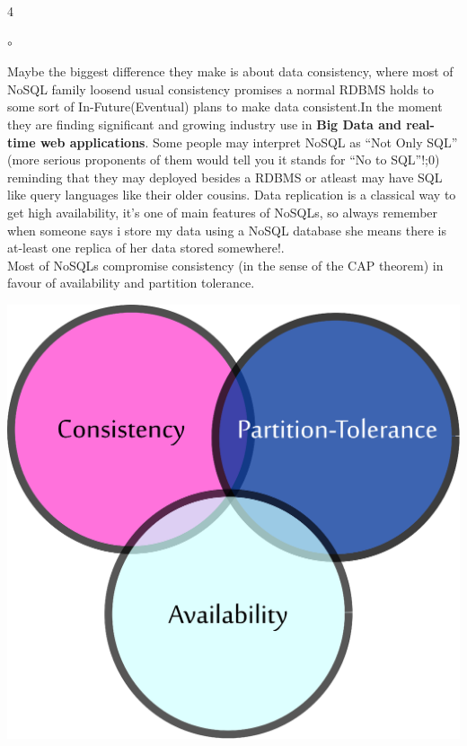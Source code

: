 \documentclass[a0,landscape]{a0poster}
\begin{document}
\begin{multicols}{4}
{\begin{list}{$\circ$}{}
\renewcommand{\labelitemi}{$\bullet$}

\item {}\par
\item {}\par
\item {}\par
 \end{list}
 
 \color{DarkSlateGray} 
Maybe the biggest difference they make is about data consistency, where most of NoSQL family loosend usual consistency promises a normal RDBMS holds to some sort of In-Future(Eventual) plans to make data consistent.In the moment they are finding significant and growing industry use in  \textbf{Big Data and real-time web applications}. Some people may interpret NoSQL as ``Not Only SQL'' (more serious proponents of them would tell you it stands for ``No to SQL''!;0) reminding that they may deployed besides a RDBMS or atleast may have SQL like query languages like their older cousins.
Data replication is a classical way to get high availability, it's one of main features of NoSQLs, so always remember when someone says i store my data using a NoSQL database she means there is at-least one replica of her data stored somewhere!.\\
Most of NoSQLs compromise consistency (in the sense of the CAP theorem) in favour of availability and partition tolerance.}
\par

\begin{center}\vspace{1cm}
\includegraphics[width=0.60\linewidth]{cap.eps}
\end{center}\vspace{1cm}



\end{multicols}
\end{document}
